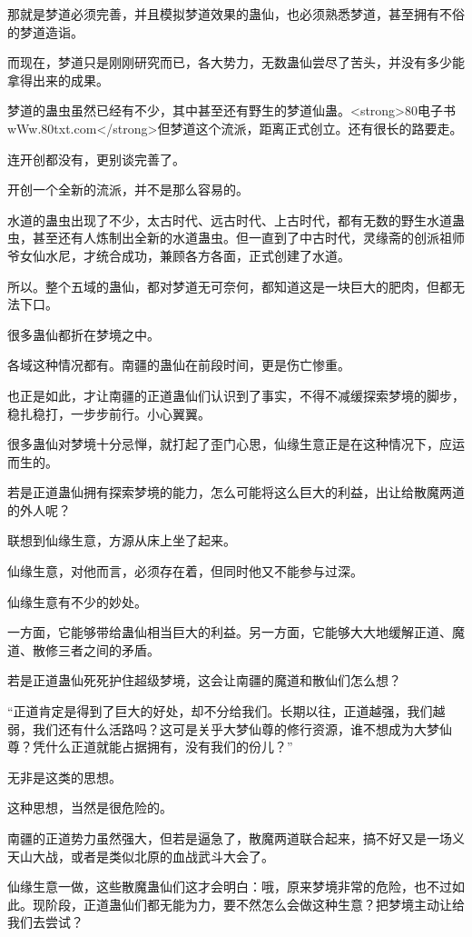 \begin{this_body}
那就是梦道必须完善，并且模拟梦道效果的蛊仙，也必须熟悉梦道，甚至拥有不俗的梦道造诣。

而现在，梦道只是刚刚研究而已，各大势力，无数蛊仙尝尽了苦头，并没有多少能拿得出来的成果。

梦道的蛊虫虽然已经有不少，其中甚至还有野生的梦道仙蛊。<strong>80电子书wWw.80txt.com</strong>但梦道这个流派，距离正式创立。还有很长的路要走。

连开创都没有，更别谈完善了。

开创一个全新的流派，并不是那么容易的。

水道的蛊虫出现了不少，太古时代、远古时代、上古时代，都有无数的野生水道蛊虫，甚至还有人炼制出全新的水道蛊虫。但一直到了中古时代，灵缘斋的创派祖师爷女仙水尼，才统合成功，兼顾各方各面，正式创建了水道。

所以。整个五域的蛊仙，都对梦道无可奈何，都知道这是一块巨大的肥肉，但都无法下口。

很多蛊仙都折在梦境之中。

各域这种情况都有。南疆的蛊仙在前段时间，更是伤亡惨重。

也正是如此，才让南疆的正道蛊仙们认识到了事实，不得不减缓探索梦境的脚步，稳扎稳打，一步步前行。小心翼翼。

很多蛊仙对梦境十分忌惮，就打起了歪门心思，仙缘生意正是在这种情况下，应运而生的。

若是正道蛊仙拥有探索梦境的能力，怎么可能将这么巨大的利益，出让给散魔两道的外人呢？

联想到仙缘生意，方源从床上坐了起来。

仙缘生意，对他而言，必须存在着，但同时他又不能参与过深。

仙缘生意有不少的妙处。

一方面，它能够带给蛊仙相当巨大的利益。另一方面，它能够大大地缓解正道、魔道、散修三者之间的矛盾。

若是正道蛊仙死死护住超级梦境，这会让南疆的魔道和散仙们怎么想？

“正道肯定是得到了巨大的好处，却不分给我们。长期以往，正道越强，我们越弱，我们还有什么活路吗？这可是关乎大梦仙尊的修行资源，谁不想成为大梦仙尊？凭什么正道就能占据拥有，没有我们的份儿？”

无非是这类的思想。

这种思想，当然是很危险的。

南疆的正道势力虽然强大，但若是逼急了，散魔两道联合起来，搞不好又是一场义天山大战，或者是类似北原的血战武斗大会了。

仙缘生意一做，这些散魔蛊仙们这才会明白：哦，原来梦境非常的危险，也不过如此。现阶段，正道蛊仙们都无能为力，要不然怎么会做这种生意？把梦境主动让给我们去尝试？


\end{this_body}
